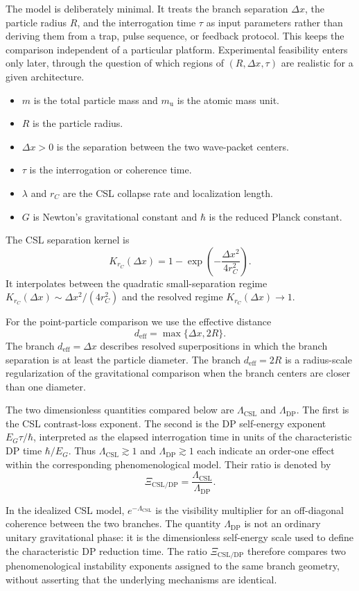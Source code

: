 \documentclass[
  aps,
  prd,
  preprint,
  notitlepage,
  superscriptaddress,
  nofootinbib,
  longbibliography
]{revtex4-2}
\newcommand{\amu}{m_{\mathrm u}}
\newcommand{\dx}{\Delta x}
\newcommand{\Lcsl}{\Lambda_{\mathrm{CSL}}}
\newcommand{\Ldp}{\Lambda_{\mathrm{DP}}}
\newcommand{\Krc}{K_{r_C}}
\newcommand{\Xic}{\Xi_{\mathrm{CSL/DP}}}
\begin{document}
The model is deliberately minimal. It treats the branch separation $\dx$, the particle radius $R$, and the interrogation time $\tau$ as input parameters rather than deriving them from a trap, pulse sequence, or feedback protocol. This keeps the comparison independent of a particular platform. Experimental feasibility enters only later, through the question of which regions of $(R,\dx,\tau)$ are realistic for a given architecture.

\begin{itemize}
\item $m$ is the total particle mass and $\amu$ is the atomic mass unit.
\item $R$ is the particle radius.
\item $\dx>0$ is the separation between the two wave-packet centers.
\item $\tau$ is the interrogation or coherence time.
\item $\lambda$ and $r_C$ are the CSL collapse rate and localization length.
\item $G$ is Newton's gravitational constant and $\hbar$ is the reduced Planck constant.
\end{itemize}

The CSL separation kernel is
\[
\Krc(\dx)=1-\exp\!\left(-\frac{\dx^2}{4r_C^2}\right).
\]
It interpolates between the quadratic small-separation regime $\Krc(\dx)\sim\dx^2/(4r_C^2)$ and the resolved regime $\Krc(\dx)\to1$.

For the point-particle comparison we use the effective distance
\[
d_{\mathrm{eff}}=\max\{\dx,2R\}.
\]
The branch $d_{\mathrm{eff}}=\dx$ describes resolved superpositions in which the branch separation is at least the particle diameter. The branch $d_{\mathrm{eff}}=2R$ is a radius-scale regularization of the gravitational comparison when the branch centers are closer than one diameter.

The two dimensionless quantities compared below are $\Lcsl$ and $\Ldp$. The first is the CSL contrast-loss exponent. The second is the DP self-energy exponent $E_G\tau/\hbar$, interpreted as the elapsed interrogation time in units of the characteristic DP time $\hbar/E_G$. Thus $\Lcsl\gtrsim1$ and $\Ldp\gtrsim1$ each indicate an order-one effect within the corresponding phenomenological model. Their ratio is denoted by
\[
\Xic=\frac{\Lcsl}{\Ldp}.
\]

In the idealized CSL model, $e^{-\Lcsl}$ is the visibility multiplier for an off-diagonal coherence between the two branches. The quantity $\Ldp$ is not an ordinary unitary gravitational phase: it is the dimensionless self-energy scale used to define the characteristic DP reduction time. The ratio $\Xic$ therefore compares two phenomenological instability exponents assigned to the same branch geometry, without asserting that the underlying mechanisms are identical.
\end{document}
